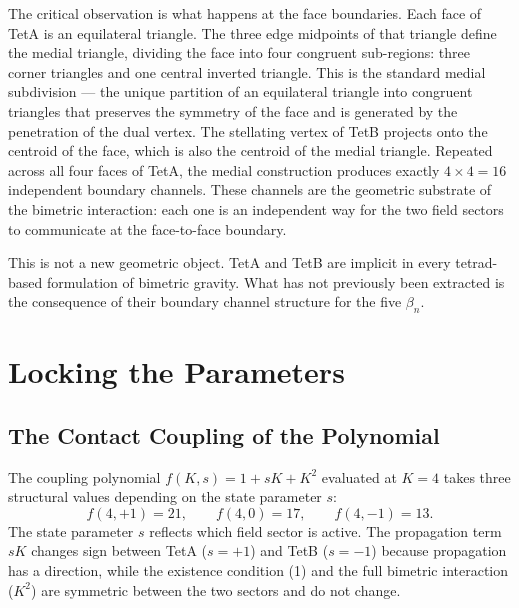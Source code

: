 \documentclass[a4paper,11pt]{article}
\begin{document}
The critical observation is what happens at the face
boundaries. Each face of TetA is an equilateral triangle.
The three edge midpoints of that triangle define the
medial triangle, dividing the face into four congruent
sub-regions: three corner triangles and one central
inverted triangle. This is the standard medial subdivision
--- the unique partition of an equilateral triangle into
congruent triangles that preserves the symmetry of the
face and is generated by the penetration of the dual vertex.
The stellating vertex of TetB projects onto the centroid
of the face, which is also the centroid of the medial
triangle. Repeated across all four faces of TetA, the
medial construction produces exactly
$4 \times 4 = 16$ independent boundary channels. These
channels are the geometric substrate of the bimetric
interaction: each one is an independent way for the two
field sectors to communicate at the face-to-face boundary.

This is not a new geometric object. TetA and TetB are
implicit in every tetrad-based formulation of bimetric
gravity. What has not previously been extracted is the
consequence of their boundary channel structure for the
five $\beta_n$.

\section{Locking the Parameters}

\subsection{The Contact Coupling of the Polynomial}

The coupling polynomial $f(K,s) = 1 + sK + K^2$ evaluated
at $K = 4$ takes three structural values depending on
the state parameter $s$:
\begin{equation}
  f(4,+1) = 21,\qquad f(4,0) = 17,\qquad f(4,-1) = 13.
\end{equation}
The state parameter $s$ reflects which field sector is
active. The propagation term $sK$ changes sign between
TetA ($s = +1$) and TetB ($s = -1$) because propagation
has a direction, while the existence condition (1) and the
full bimetric interaction ($K^2$) are symmetric between
the two sectors and do not change.
\end{document}
